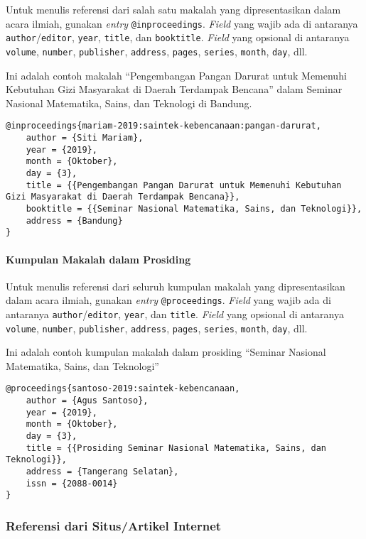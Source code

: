 Untuk menulis referensi dari salah satu makalah yang dipresentasikan dalam acara ilmiah, gunakan \textit{entry} \texttt{@inproceedings}. \textit{Field} yang wajib ada di antaranya \texttt{author}/\texttt{editor}, \texttt{year}, \texttt{title}, dan \texttt{booktitle}. \textit{Field} yang opsional di antaranya \texttt{volume}, \texttt{number}, \texttt{publisher}, \texttt{address}, \texttt{pages}, \texttt{series}, \texttt{month}, \texttt{day}, dll.

Ini adalah contoh makalah ``Pengembangan Pangan Darurat untuk Memenuhi Kebutuhan Gizi Masyarakat di Daerah Terdampak Bencana'' dalam Seminar Nasional Matematika, Sains, dan Teknologi di Bandung. 

\begin{lstlisting}
@inproceedings{mariam-2019:saintek-kebencanaan:pangan-darurat,
    author = {Siti Mariam},
    year = {2019},
    month = {Oktober},
    day = {3},
    title = {{Pengembangan Pangan Darurat untuk Memenuhi Kebutuhan Gizi Masyarakat di Daerah Terdampak Bencana}},
    booktitle = {{Seminar Nasional Matematika, Sains, dan Teknologi}},
    address = {Bandung}
}
\end{lstlisting}

\paragraph{Kumpulan Makalah dalam Prosiding}

Untuk menulis referensi dari seluruh kumpulan makalah yang dipresentasikan dalam acara ilmiah, gunakan \textit{entry} \texttt{@proceedings}. \textit{Field} yang wajib ada di antaranya \texttt{author}/\texttt{editor}, \texttt{year}, dan \texttt{title}. \textit{Field} yang opsional di antaranya \texttt{volume}, \texttt{number}, \texttt{publisher}, \texttt{address}, \texttt{pages}, \texttt{series}, \texttt{month}, \texttt{day}, dll.

Ini adalah contoh kumpulan makalah dalam prosiding ``Seminar Nasional Matematika, Sains, dan Teknologi''

\begin{lstlisting}
@proceedings{santoso-2019:saintek-kebencanaan,
    author = {Agus Santoso},
    year = {2019},
    month = {Oktober},
    day = {3},
    title = {{Prosiding Seminar Nasional Matematika, Sains, dan Teknologi}},
    address = {Tangerang Selatan},
    issn = {2088-0014}
}
\end{lstlisting}

\subsubsection{Referensi dari Situs/Artikel Internet}

